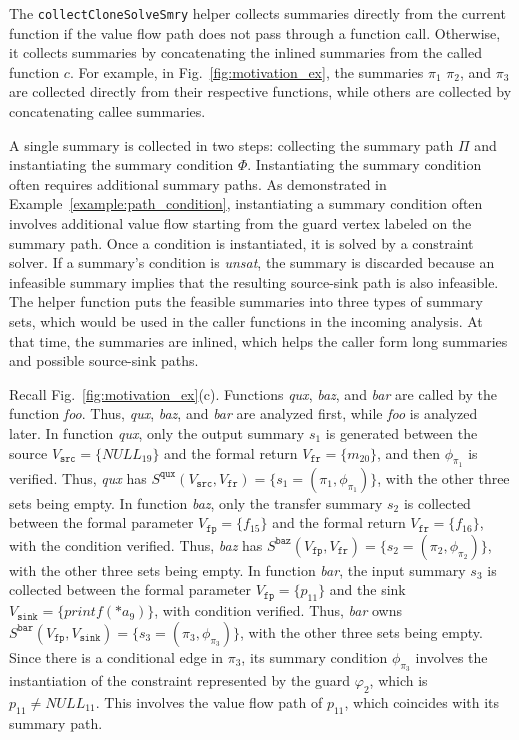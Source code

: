 The \texttt{collectCloneSolveSmry} helper collects summaries directly from the current function if the value flow path does not pass through a function call. Otherwise, it collects summaries by concatenating the inlined summaries from the called function $c$. 
For example, in Fig.~\ref{fig:motivation_ex}, the summaries $\pi_{1}$ $\pi_{2}$, and $\pi_{3}$ are collected directly from their respective functions, while others are collected by concatenating callee summaries.

A single summary is collected in two steps: collecting the summary path $\Pi$ and instantiating the summary condition $\Phi$. 
Instantiating the summary condition often requires additional summary paths. 
As demonstrated in Example~\ref{example:path_condition}, instantiating a summary condition often involves additional value flow starting from the guard vertex labeled on the summary path. 
Once a condition is instantiated, it is solved by a constraint solver. 
If a summary's condition is \textit{unsat}, the summary is discarded because an infeasible summary implies that the resulting source-sink path is also infeasible.
The helper function puts the feasible summaries into three types of summary sets, which would be used in the caller functions in the incoming analysis.
At that time, the summaries are inlined, which helps the caller form long summaries and possible source-sink paths.


\begin{example}
Recall Fig.~\ref{fig:motivation_ex}(c). 
Functions \textit{qux}, \textit{baz}, and \textit{bar} are called by the function \textit{foo}. 
Thus, \textit{qux}, \textit{baz}, and \textit{bar} are analyzed first, while \textit{foo} is analyzed later.
In function \textit{qux}, only the output summary $s_{1}$ is generated between the source $V_{\texttt{src}} = \{NULL_{19}\}$ and the formal return $V_{\texttt{fr}} = \{m_{20}\}$, and then $\phi_{\pi_{1}}$ is verified.
Thus, \textit{qux} has $S^{\texttt{qux}}(V_{\texttt{src}}, V_{\texttt{fr}}) = \{s_1=(\pi_{1},\phi_{\pi_{1}})\}$, with the other three sets being empty.
In function \textit{baz}, only the transfer summary $s_{2}$ is collected between the formal parameter $V_{\texttt{fp}} = \{f_{15}\}$ and the formal return $V_{\texttt{fr}} = \{f_{16}\}$, with the condition verified.
Thus, \textit{baz} has $S^{\texttt{baz}}(V_{\texttt{fp}}, V_{\texttt{fr}}) = \{s_2=(\pi_{2},\phi_{\pi_{2}})\}$, with the other three sets being empty.
In function \textit{bar}, the input summary $s_{3}$ is collected between the formal parameter $V_{\texttt{fp}} = \{p_{11}\}$ and the sink $V_{\texttt{sink}} = \{printf(*a_{9})\}$, with condition verified.
Thus, \textit{bar} owns $S^{\texttt{bar}}(V_{\texttt{fp}}, V_{\texttt{sink}}) = \{s_3=(\pi_{3}, \phi_{\pi_{3}})\}$, with the other three sets being empty.
Since there is a conditional edge in $\pi_{3}$, its summary condition $\phi_{\pi_{3}}$ involves the instantiation of the constraint represented by the guard $\varphi_2$, which is $p_{11} \neq NULL_{11}$. This involves the value flow path of $p_{11}$, which coincides with its summary path.

\end{example}

